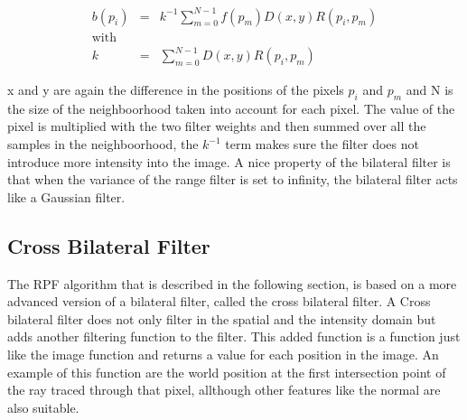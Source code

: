 \begin{equation}
\begin{aligned}
   b(p_i) &=& k^{-1}\sum_{m=0}^{N-1} f(p_m)D(x,y)R(p_i,p_m) \\
   \text{with} \\
   k &=& \sum_{m=0}^{N-1} D(x,y)R(p_i,p_m)
\end{aligned}
\end{equation}

x and y are again the difference in the positions of the pixels $p_i$ and $p_m$ and N is the size of the neighboorhood taken into account for each pixel.
The value of the pixel is multiplied with the two filter weights and then summed over all the samples in the neighboorhood, the $k^{-1}$ term makes sure the filter does not introduce more intensity into the image.
A nice property of the bilateral filter is that when the variance of the range filter is set to infinity, the bilateral filter acts like a Gaussian filter.


\subsection{Cross Bilateral Filter}
The RPF algorithm that is described in the following section, is based on a more advanced version of a bilateral filter, called the cross bilateral filter.
A Cross bilateral filter does not only filter in the spatial and the intensity domain but adds another filtering function to the filter.
This added function is a function just like the image function and returns a value for each position in the image.
An example of this function are the world position at the first intersection point of the ray traced through that pixel, allthough other features like the normal are also suitable.
